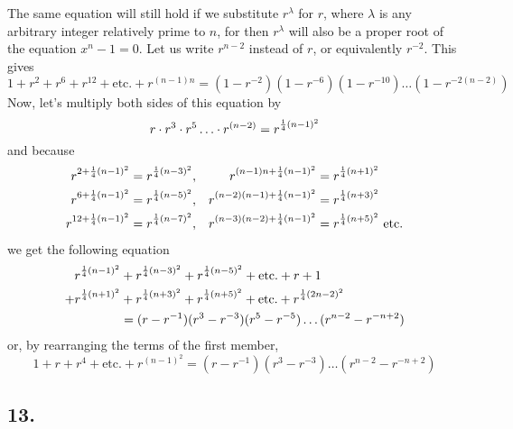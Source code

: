 \documentclass[twoside,12pt]{memoir}
\let\oldfrac\frac
\def\frac#1#2{\mathchoice{\tfrac{#1}{#2}}{\oldfrac{#1}{#2}}{\genfrac{}{}{}{2}{#1}{#2\mathstrut}}{\genfrac{}{}{}{3}{#1}{#2\mathstrut}}}
\begin{document}
The same equation will still hold if we substitute \(r^{\lambda}\) for \(r\), where \(\lambda\) is any arbitrary integer relatively prime to \(n\), for then \(r^{\lambda}\) will also be a proper root of the equation \(x^{n}-1=0\). Let us write \(r^{n-2}\) instead of \(r\), or equivalently \(r^{-2}\).  This gives
\[1+r^{2}+r^{6}+r^{12}+\text{etc{.}}+r^{(n-1) n}=(1-r^{-2})(1-r^{-6})(1-r^{-10}) \ldots(1-r^{-2(n-2)})\]
Now, let's multiply both sides of this equation by
\[r \cdot r^{3} \cdot r^{5} \ldots \cdot r^{(n-2)}=r^{\frac{1}{4}(n-1)^{2}}\]
and because
\[\begin{alignedat}[t]{4}
r^{2+\frac{1}{4}(n-1)^{2}} & =r^{\frac{1}{4}(n-3)^{2}},\quad & r^{(n-1) n+\frac{1}{4}(n-1)^{2}}&=r^{\frac{1}{4}(n+1)^{2}} \\
r^{6+\frac{1}{4}(n-1)^{2}} & =r^{\frac{1}{4}(n-5)^{2}},\quad & r^{(n-2)(n-1)+\frac{1}{4}(n-1)^{2}}&=r^{\frac{1}{4}(n+3)^{2}} \\
r^{12+\frac{1}{4}(n-1)^{2}} & =r^{\frac{1}{4}(n-7)^{2}},\quad & r^{(n-3)(n-2)+\frac{1}{4}(n-1)^{2}}&=r^{\frac{1}{4}(n+5)^{2}} \text{ etc{.}}
\end{alignedat}\]
we get the following equation
\[\begin{aligned}
 r^{\frac{1}{4}(n-1)^{2}}&+r^{\frac{1}{4}(n-3)^{2}}+r^{\frac{1}{4}(n-5)^{2}}+\text{etc{.}}+r+1 \\
+r^{\frac{1}{4}(n+1)^{2}}&+r^{\frac{1}{4}(n+3)^{2}}+r^{\frac{1}{4}(n+5)^{2}}+\text{etc{.}}+r^{\frac{1}{4}(2 n-2)^{2}} \\
&=(r-r^{-1})(r^{3}-r^{-3})(r^{5}-r^{-5}) \ldots(r^{n-2}-r^{-n+2})
\end{aligned}\]
or, by rearranging the terms of the first member,
\[1+r+r^{4}+\text{etc{.}}+r^{(n-1)^{2}}=(r-r^{-1})(r^{3}-r^{-3}) \ldots(r^{n-2}-r^{-n+2}) \tag{5}\]
%

\subsection*{13.}
\end{document}
